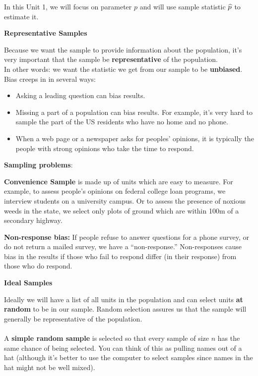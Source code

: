 In this Unit 1, we will focus on parameter $p$ and will use sample
statistic $\widehat{p}$ to estimate it.

\begin{center}
  {\bf Representative Samples}
\end{center}

Because we want the sample to provide information about the
population, it's very important that the sample be {\bf
  representative} of the population. \\
In other words: we want the statistic we get from our sample to be
{\bf unbiased}.  Bias creeps in in several ways:
\begin{itemize}
  \item Asking a leading question can bias results.  
  \item Missing a part of a population can bias results.  For example,
    it's very hard to sample the part of the US residents who have
    no home and no phone.
  \item When a web page or a newspaper asks for peoples' opinions, it
    is typically the people with strong opinions who take the time
    to respond. 
\end{itemize}

\begin{center}
  {\bf Sampling problems}:\vspace{-.5cm}
\end{center}
\begin{list}{}{}
\item [\bf Convenience Sample]  is made up of units which are easy to
  measure. For example, to assess people's opinions on federal college
  loan programs, we interview students on a university campus.  Or to
  assess the presence of noxious weeds in the state, we select only plots
  of ground which are within 100m of a secondary highway. 
\item [\bf Non-response bias:] If people refuse to answer questions
  for a phone survey, or do not return a mailed survey, we have a
  ``non-response.'' Non-responses cause bias in the results if those
  who fail to respond differ (in their response) from those who do
  respond. 
\end{list}

\begin{center}
  {\bf Ideal Samples}
\end{center}
 Ideally we will have a list of all units in the population and can
 select units {\bf at random} to be in our sample. 
Random selection assures us that the sample will generally be
representative of the population.\\ \\
 A {\bf simple random sample} is selected so that every sample of size
 $n$ has the same chance of being selected.  You can think of this as
 pulling names out of a hat (although it's better to use the computer
 to select samples since names in the hat might not be well mixed). 

